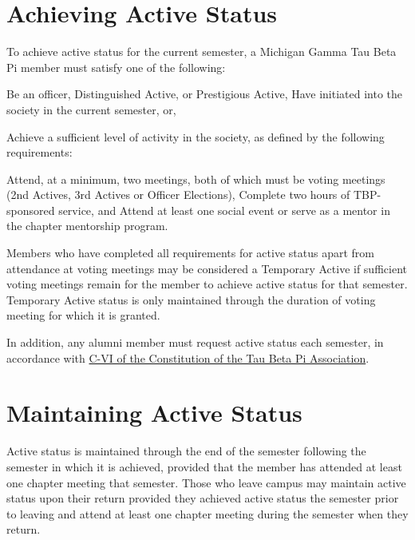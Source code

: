 \newpage
\section{Achieving Active Status} To achieve active status for the current semester, a Michigan Gamma Tau Beta Pi member must satisfy one of the following:
\begin{enumsubsection} %
\itemnotoc	Be an officer, Distinguished Active, or Prestigious Active,
\itemnotoc	Have initiated into the society in the current semester, or,


\itemnotoc	Achieve a sufficient level of activity in the society, as defined by the following requirements:
\begin{enumsubsubsection}
\itemnotoc	Attend, at a minimum, two meetings, both of which must be  voting meetings (2nd Actives, 3rd Actives or Officer Elections),
\itemnotoc	Complete two hours of TBP-sponsored service, and
\itemnotoc	Attend at least one social event or serve as a mentor in the chapter mentorship program.
\end{enumsubsubsection} 
\end{enumsubsection} 
Members who have completed all requirements for active status apart from attendance at voting meetings may be considered a Temporary Active if sufficient voting meetings remain for the member to achieve active status for that semester. Temporary Active status is only maintained through the duration of voting meeting for which it is granted. 

In addition, any alumni member must request active status each semester, in accordance with \href{http://www.tbp.org/off/ConstBylaw.pdf}{C-VI of the Constitution of the Tau Beta Pi Association}.

\section{Maintaining Active Status} Active status is maintained through the end of the semester following the semester in which it is achieved, provided that the member has attended at least one chapter meeting that semester. Those who leave campus may maintain active status upon their return provided they achieved active status the semester prior to leaving and attend at least one chapter meeting during the semester when they return.

